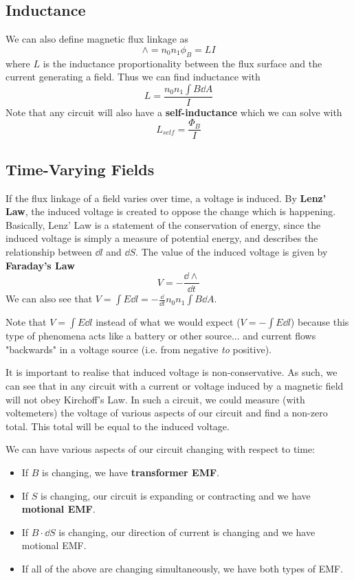 \documentclass[12pt]{article}
\newcommand{\inint}[2]{\int #1 \dd #2}
\begin{document}
\subsection*{Inductance}
We can also define magnetic flux linkage as \[ \land = n_0n_1\phi_B = LI \] where $L$ is the inductance proportionality between the flux surface and the current generating a field. Thus we can find inductance with \[ L = \frac{n_0n_1 \inint{B}{A}}{I} \] Note that any circuit will also have a {\bf self-inductance} which we can solve with \[ L_{self} = \frac{\Phi_B}{I} \]

\subsection*{Time-Varying Fields}
If the flux linkage of a field varies over time, a voltage is induced. By {\bf Lenz' Law}, the induced voltage is created to oppose the change which is happening. Basically, Lenz' Law is a statement of the conservation of energy, since the induced voltage is simply a measure of potential energy, and describes the relationship between $\dd l$ and $\dd S$. The value of the induced voltage is given by {\bf Faraday's Law} \[ V = -\frac{\dd \land}{\dd t} \] We can also see that $V = \inint{E}{l} = -\frac{\dd}{\dd t} n_0n_1 \inint{B}{A}$.

Note that $V = \inint{E}{l}$ instead of what we would expect ($V = -\inint{E}{l}$) because this type of phenomena acts like a battery or other source... and current flows "backwards" in a voltage source (i.e. from negative \emph{to} positive).

It is important to realise that induced voltage is non-conservative. As such, we can see that in any circuit with a current or voltage induced by a magnetic field will not obey Kirchoff's Law. In such a circuit, we could measure (with voltemeters) the voltage of various aspects of our circuit and find a non-zero total. This total will be equal to the induced voltage.

We can have various aspects of our circuit changing with respect to time:
\begin{itemize}
\item If $B$ is changing, we have {\bf transformer EMF}.
\item If $S$ is changing, our circuit is expanding or contracting and we have {\bf motional EMF}.
\item If $B \cdot \dd S$ is changing, our direction of current is changing and we have motional EMF.
\item If all of the above are changing simultaneously, we have both types of EMF.
\end{itemize}
\end{document}
